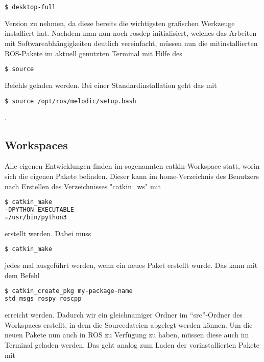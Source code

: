 \begin{appendix}
\begin{lstlisting}[language=bash]
$ desktop-full
\end{lstlisting}

Version zu nehmen, da diese bereits die wichtigsten grafischen Werkzeuge installiert hat. Nachdem man nun noch rosdep initialisiert, welches das Arbeiten mit Softwareabhängigkeiten deutlich vereinfacht, müssen nun die mitinstallierten ROS-Pakete im aktuell genutzten Terminal mit Hilfe des 

\begin{lstlisting}[language=bash]
$ source
\end{lstlisting}

Befehls geladen werden. Bei einer Standardinstallation geht das mit 

\begin{lstlisting}[language=bash]
$ source /opt/ros/melodic/setup.bash
\end{lstlisting}. \cite{martinez2013learning}

\subsection{Workspaces}
Alle eigenen Entwicklungen finden im sogenannten catkin-Workspace statt, worin sich die eigenen Pakete befinden. Dieser kann im home-Verzeichnis des Benutzers nach Erstellen des Verzeichnisses "catkin\_ws" mit 

\begin{lstlisting}[language=bash]
$ catkin_make 
-DPYTHON_EXECUTABLE
=/usr/bin/python3
\end{lstlisting}

erstellt werden. Dabei muss 

\begin{lstlisting}[language=bash]
$ catkin_make
\end{lstlisting}

jedes mal ausgeführt werden, wenn ein neues Paket erstellt wurde. Das kann mit dem Befehl 

\begin{lstlisting}[language=bash]
$ catkin_create_pkg my-package-name 
std_msgs rospy roscpp
\end{lstlisting}

erreicht werden. Dadurch wir ein gleichnamiger Ordner im ``src''-Ordner des Workspaces erstellt, in dem die Sourcedateien abgelegt werden können. Um die neuen Pakete nun auch in ROS zu Verfügung zu haben, müssen diese auch im Terminal geladen werden. Das geht analog zum Laden der vorinstallierten Pakete mit 


\end{appendix}
